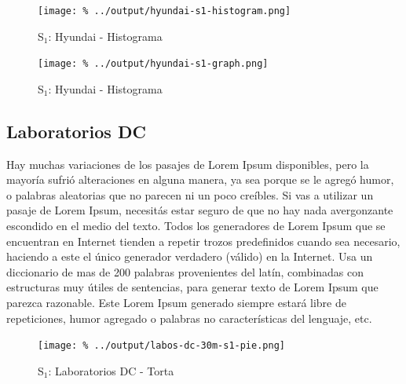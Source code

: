 \documentclass[final,inline,a4paper,narroweqnarray]{ieee}
\begin{document}
    \begin{figure}[ht]\begin{center}
      \texttt{[image: \%
      ../output/hyundai-s1-histogram.png]}
      \vspace{-2em}
      \caption{S$_1$: Hyundai - Histograma}
      \label{hyundai-s1-histogram}
    \end{center}\end{figure}

    \begin{figure}[ht]\begin{center}
      \texttt{[image: \%
      ../output/hyundai-s1-graph.png]}
      \vspace{-2em}
      \caption{S$_1$: Hyundai - Histograma}
      \label{hyundai-s1-histogram}
    \end{center}\end{figure}

  \subsection{Laboratorios DC}

Hay muchas variaciones de los pasajes de Lorem Ipsum disponibles, pero la mayoría sufrió alteraciones en alguna manera, ya sea porque se le agregó humor, o palabras aleatorias que no parecen ni un poco creíbles. Si vas a utilizar un pasaje de Lorem Ipsum, necesitás estar seguro de que no hay nada avergonzante escondido en el medio del texto. Todos los generadores de Lorem Ipsum que se encuentran en Internet tienden a repetir trozos predefinidos cuando sea necesario, haciendo a este el único generador verdadero (válido) en la Internet. Usa un diccionario de mas de 200 palabras provenientes del latín, combinadas con estructuras muy útiles de sentencias, para generar texto de Lorem Ipsum que parezca razonable. Este Lorem Ipsum generado siempre estará libre de repeticiones, humor agregado o palabras no características del lenguaje, etc.

    \begin{figure}[ht]\begin{center}
      \texttt{[image: \%
      ../output/labos-dc-30m-s1-pie.png]}
      \vspace{-2em}
      \caption{S$_1$: Laboratorios DC - Torta}
      \label{labos-dc-30m-s1-pie}
    \end{center}\end{figure}
\end{document}
